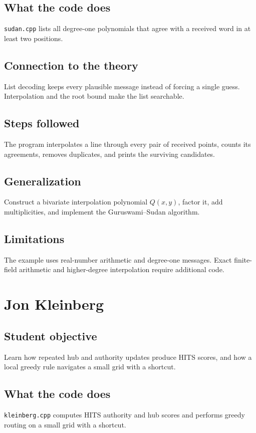 \documentclass[11pt]{book}
\begin{document}
\section{What the code does}
\texttt{sudan.cpp} lists all degree-one polynomials that agree with a received word in at least two positions.

\section{Connection to the theory}
List decoding keeps every plausible message instead of forcing a single guess. Interpolation and the root bound make the list searchable.

\section{Steps followed}
The program interpolates a line through every pair of received points, counts its agreements, removes duplicates, and prints the surviving candidates.

\section{Generalization}
Construct a bivariate interpolation polynomial $Q(x,y)$, factor it, add multiplicities, and implement the Guruswami--Sudan algorithm.

\section{Limitations}
The example uses real-number arithmetic and degree-one messages. Exact finite-field arithmetic and higher-degree interpolation require additional code.

\chapter{Jon Kleinberg}
\section{Student objective}
Learn how repeated hub and authority updates produce HITS scores, and how a local greedy rule navigates a small grid with a shortcut.
\section{What the code does}
\texttt{kleinberg.cpp} computes HITS authority and hub scores and performs greedy routing on a small grid with a shortcut.
\end{document}
